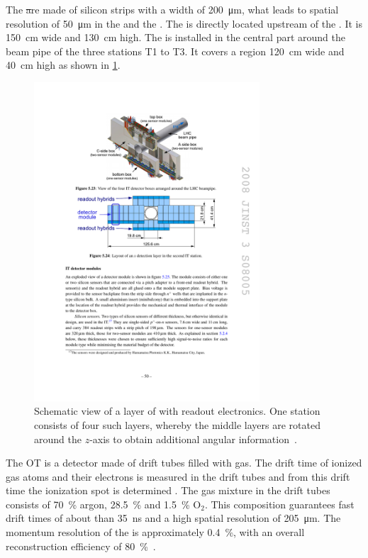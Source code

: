 The \st are made of silicon strips with a width of \SI{200}{\micro\metre}, what leads to spatial resolution of \SI{50}{\micro\metre} in the \intr and the \ttracker.
The \ttracker is directly located upstream of the \richone.
It is \SI{150}{\centi\metre} wide and \SI{130}{\centi\metre} high.
The \intr is installed in the central part around the beam pipe of the three stations T1 to T3.
It covers a region \SI{120}{\centi\metre} wide and \SI{40}{\centi\metre} high as shown in \cref{fig:InnerTracker}.
\begin{figure}[tbp]
    \centering
    \includegraphics[width=0.75\textwidth]{05lhcb/figs/IT.pdf}
    \caption{Schematic view of a layer of \intr with readout electronics.
    One station consists of four such layers, whereby the middle layers are rotated around the $z$-axis to obtain additional angular information~\cite{Alves:2008zz}.}
    \label{fig:InnerTracker}
\end{figure}

The OT is a detector made of drift tubes filled with gas.
The drift time of ionized gas atoms and their electrons is measured in the drift tubes and from this drift time the ionization spot is determined .
The gas mixture in the drift tubes consists of \SI{70}{\percent} argon, \SI{28.5}{\percent} \cotwo and \SI{1.5}{\percent} $\mathrm O_2$.
This composition guarantees fast drift times of about than \SI{35}{\nano\second} and a high spatial resolution of \SI{205}{\micro\metre}.
The momentum resolution of the \ot is approximately \SI{0.4}{\percent}, with an overall reconstruction efficiency of \SI{80}{\percent}~\cite{Alves:2008zz}.

